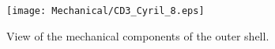 \begin{figure}[h]
\vspace{1cm}
\begin{centering}
\texttt{[image: Mechanical/CD3\_Cyril\_8.eps]}
\hspace{0.1cm}
\vspace{1cm}
\caption{\small{View of the mechanical components of the outer shell.}} 
\label{exit}
\end{centering}
\end{figure}
